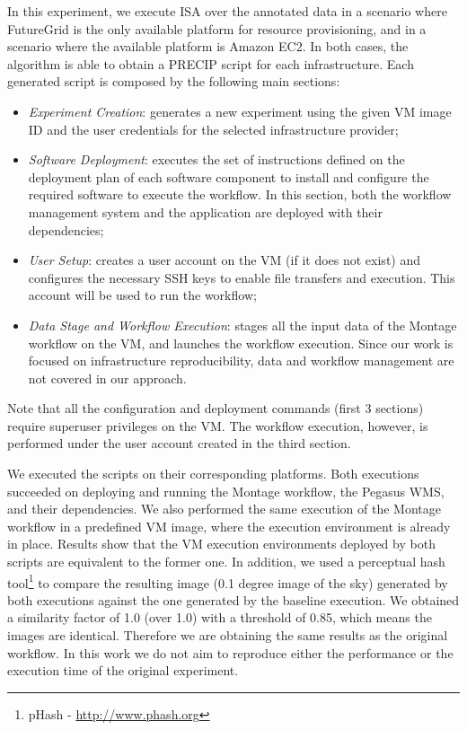 In this experiment, we execute ISA over the annotated data in a scenario where FutureGrid is the only available platform for resource provisioning, and in a scenario where the available platform is Amazon EC2. In both cases, the algorithm is able to obtain a PRECIP script for each infrastructure. Each generated script is composed by the following main sections:

\begin{itemize}

	\item \emph{Experiment Creation}: generates a new experiment using the given VM image ID and the user credentials for the selected infrastructure provider;
    	    
	\item \emph{Software Deployment}: executes the set of instructions defined on the deployment plan of each software component to install and configure the required software to execute the workflow. In this section, both the workflow management system and the application are deployed with their dependencies;

	\item \emph{User Setup}: creates a user account on the VM (if it does not exist) and configures the necessary SSH keys to enable file transfers and execution. This account will be used to run the workflow;
	   
	\item \emph{Data Stage and Workflow Execution}: stages all the input data of the Montage workflow on the VM, and launches the workflow execution. Since our work is focused on infrastructure reproducibility, data and workflow management are not covered in our approach.

\end{itemize}

\noindent Note that all the configuration and deployment commands (first 3 sections) require superuser privileges on the VM. The workflow execution, however, is performed under the user account created in the third section.

We executed the scripts on their corresponding platforms. Both executions succeeded on deploying and running the Montage workflow, the Pegasus WMS, and their dependencies. We also performed the same execution of the Montage workflow in a predefined VM image, where the execution environment is already in place. Results show that the VM execution environments deployed by both scripts are equivalent to the former one. In addition, we used a perceptual hash tool\footnote{pHash - \url{http://www.phash.org}} to compare the resulting image (0.1 degree image of the sky) generated by both executions against the one generated by the baseline execution. We obtained a similarity factor of 1.0 (over 1.0) with a threshold of 0.85, which means the images are identical. Therefore we are obtaining the same results as the original workflow. In this work we do not aim to reproduce either the performance or the execution time of the original experiment.


